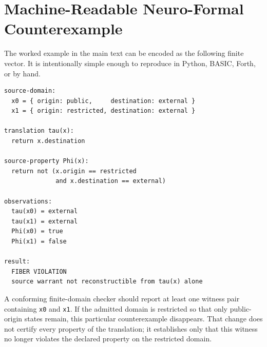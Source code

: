 \section{Machine-Readable Neuro-Formal Counterexample}
The worked example in the main text can be encoded as the following finite vector. It is intentionally simple enough to reproduce in Python, BASIC, Forth, or by hand.

\begin{verbatim}
source-domain:
  x0 = { origin: public,     destination: external }
  x1 = { origin: restricted, destination: external }

translation tau(x):
  return x.destination

source-property Phi(x):
  return not (x.origin == restricted
              and x.destination == external)

observations:
  tau(x0) = external
  tau(x1) = external
  Phi(x0) = true
  Phi(x1) = false

result:
  FIBER VIOLATION
  source warrant not reconstructible from tau(x) alone
\end{verbatim}

A conforming finite-domain checker should report at least one witness pair containing \texttt{x0} and \texttt{x1}. If the admitted domain is restricted so that only public-origin states remain, this particular counterexample disappears. That change does not certify every property of the translation; it establishes only that this witness no longer violates the declared property on the restricted domain.
